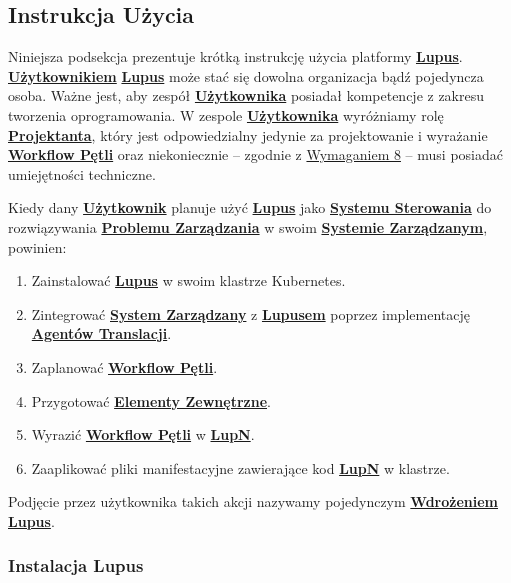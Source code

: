 \subsection{Instrukcja Użycia}

Niniejsza podsekcja prezentuje krótką instrukcję użycia platformy \hyperlink{def:lupus}{\textbf{Lupus}}. \hyperlink{def:uzytkownik}{\textbf{Użytkownikiem}} \hyperlink{def:lupus}{\textbf{Lupus}} może stać się dowolna organizacja bądź pojedyncza osoba. Ważne jest, aby zespół \hyperlink{def:uzytkownik}{\textbf{Użytkownika}} posiadał kompetencje z zakresu tworzenia oprogramowania. W zespole \hyperlink{def:uzytkownik}{\textbf{Użytkownika}} wyróżniamy rolę \hyperlink{def:projektant}{\textbf{Projektanta}}, który jest odpowiedzialny jedynie za projektowanie i wyrażanie \hyperlink{def:workflow-petli}{\textbf{Workflow Pętli}} oraz niekoniecznie – zgodnie z \hyperref[req:8]{Wymaganiem 8} – musi posiadać umiejętności techniczne. 

Kiedy dany \hyperlink{def:uzytkownik}{\textbf{Użytkownik}} planuje użyć \hyperlink{def:lupus}{\textbf{Lupus}} jako \hyperlink{def:system-sterowania}{\textbf{Systemu Sterowania}} do rozwiązywania \hyperlink{def:problem-zarzadzania}{\textbf{Problemu Zarządzania}} w swoim \hyperlink{def:system-zarzadzany}{\textbf{Systemie Zarządzanym}}, powinien:
\begin{enumerate}
    \item Zainstalować \hyperlink{def:lupus}{\textbf{Lupus}} w swoim klastrze Kubernetes.
    \item Zintegrować \hyperlink{def:system-zarzadzany}{\textbf{System Zarządzany}} z \hyperlink{def:lupus}{\textbf{Lupusem}} poprzez implementację \hyperlink{def:agent-translacji}{\textbf{Agentów Translacji}}.
    \item Zaplanować \hyperlink{def:workflow-petli}{\textbf{Workflow Pętli}}.
    \item Przygotować \hyperlink{def:element-zewnetrzny}{\textbf{Elementy Zewnętrzne}}.
    \item Wyrazić \hyperlink{def:workflow-petli}{\textbf{Workflow Pętli}} w \hyperlink{def:lupn}{\textbf{LupN}}.
    \item Zaaplikować pliki manifestacyjne zawierające kod \hyperlink{def:lupn}{\textbf{LupN}} w klastrze.
\end{enumerate}

Podjęcie przez użytkownika takich akcji nazywamy pojedynczym \hyperlink{def:wdrozenie-lupus}{\textbf{Wdrożeniem Lupus}}.

\subsubsection{Instalacja Lupus}

